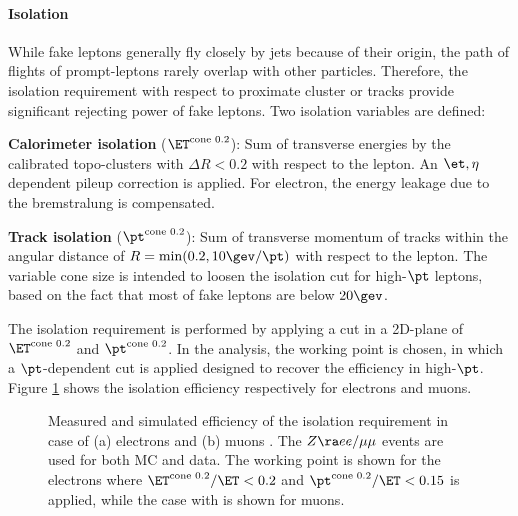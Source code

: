 \paragraph{Isolation}
While fake leptons generally fly closely by jets because of their origin,
the path of flights of prompt-leptons rarely overlap with other particles.
Therefore, the isolation requirement with respect to proximate cluster or tracks provide significant rejecting power of fake leptons. 
Two isolation variables are defined:

\begin{description}
\item {\textbf{Calorimeter isolation} ($\etcone$)}: Sum of transverse energies by the calibrated topo-clusters 
with  $\Delta R<0.2$ with respect to the lepton. An $\et,\eta$ dependent pileup correction is applied. For electron, the energy leakage due to the bremstralung is compensated. 

\item {\textbf{Track isolation} ($\ptcone$)}: Sum of transverse momentum of tracks within the angular distance of $R=\min(0.2, 10\gev/\pt)$ with respect to the lepton. The variable cone size is intended to loosen the isolation cut for high-$\pt$ leptons, based on the fact that most of fake leptons are below $20\gev$.
\end{description}

The isolation requirement is performed by applying a cut in a 2D-plane of $\etcone$ and $\ptcone$. 
In the analysis, the  working point is chosen, in which a $\pt$-dependent cut is applied designed to recover the efficiency in high-$\pt$. Figure \ref{fig::objDef::isoEff}  shows the isolation efficiency respectively for electrons and muons. \\

\begin{figure}[h]
  \centering
    \caption{ Measured and simulated efficiency of the isolation requirement in case of (a) electrons \cite{156_ElectronEffMeas_2015data} and (b) muons \cite{166_muonPerformance2015data}. The $Z\ra ee/\mu\mu$ events are used for both MC and data.
      The  working point is shown for the electrons where $\etcone/\ET<0.2$ and $\ptcone/\ET<0.15$ is applied, while the case with  is shown for muons.
      \label{fig::objDef::isoEff} }
\end{figure}



